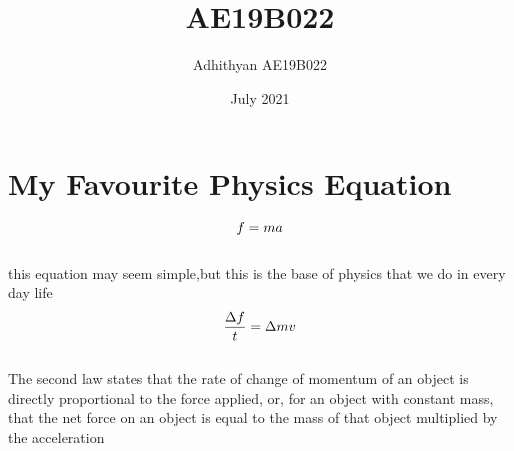 \documentclass{article}
\title{AE19B022}
\author{Adhithyan AE19B022}
\date{July 2021}
\begin{document}
\maketitle
\section{My Favourite Physics Equation}
\hspace{6mm}
\begin{equation}
\label{eqn:main_eq}
\Large
     f=ma
\end{equation}
\\
this equation may seem simple,but this is the base of physics that we do in every day life \\
\begin{equation}
\label{eqn:sim_eq}
\Large
    \frac{\Delta f}{t}=\Delta mv
\end{equation}
\\
The second law states that the rate of change of momentum of an object is directly proportional to the force applied, or, for an object with constant mass, that the net force on an object is equal to the mass of that object multiplied by the acceleration
\end{document}
